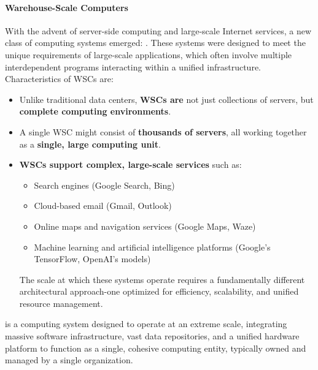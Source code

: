 \newpage

\paragraph{Warehouse-Scale Computers}

With the advent of server-side computing and large-scale Internet services, a new class of computing systems emerged: . These systems were designed to meet the unique requirements of large-scale applications, which often involve multiple interdependent programs interacting within a unified infrastructure. Characteristics of WSCs are:
\begin{itemize}
    \item Unlike traditional data centers, \textbf{WSCs are} not just collections of servers, but \textbf{complete computing environments}.
    \item A single WSC might consist of \textbf{thousands of servers}, all working together as a \textbf{single, large computing unit}.
    \item \textbf{WSCs support complex, large-scale services} such as:
    \begin{itemize}
        \item Search engines (Google Search, Bing)
        \item Cloud-based email (Gmail, Outlook)
        \item Online maps and navigation services (Google Maps, Waze)
        \item Machine learning and artificial intelligence platforms (Google's TensorFlow, OpenAI's models)
    \end{itemize}
    The scale at which these systems operate requires a fundamentally different architectural approach-one optimized for efficiency, scalability, and unified resource management.
\end{itemize}

\begin{definitionbox}
     is a computing system designed to operate at an extreme scale, integrating massive software infrastructure, vast data repositories, and a unified hardware platform to function as a single, cohesive computing entity, typically owned and managed by a single organization.
\end{definitionbox}

